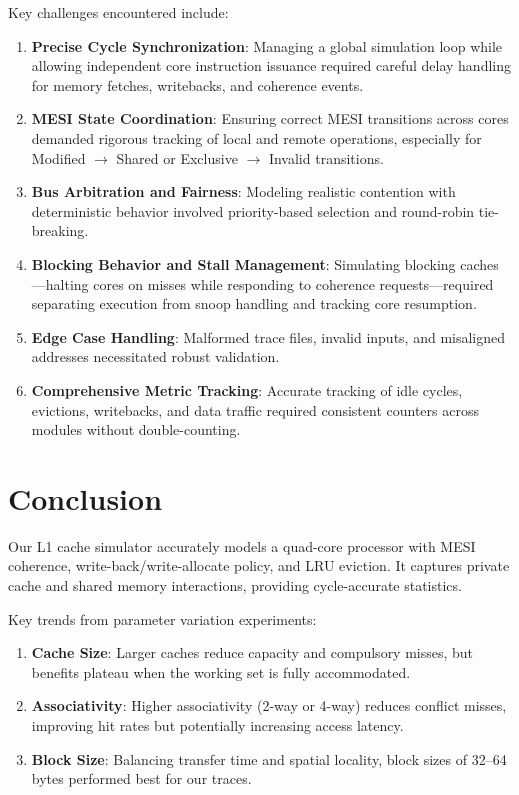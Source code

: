 \documentclass[11pt]{article}
\begin{document}
Key challenges encountered include:
\begin{enumerate}
    \item \textbf{Precise Cycle Synchronization}: Managing a global simulation loop while allowing independent core instruction issuance required careful delay handling for memory fetches, writebacks, and coherence events.
    \item \textbf{MESI State Coordination}: Ensuring correct MESI transitions across cores demanded rigorous tracking of local and remote operations, especially for Modified $\to$ Shared or Exclusive $\to$ Invalid transitions.
    \item \textbf{Bus Arbitration and Fairness}: Modeling realistic contention with deterministic behavior involved priority-based selection and round-robin tie-breaking.
    \item \textbf{Blocking Behavior and Stall Management}: Simulating blocking caches—halting cores on misses while responding to coherence requests—required separating execution from snoop handling and tracking core resumption.
    \item \textbf{Edge Case Handling}: Malformed trace files, invalid inputs, and misaligned addresses necessitated robust validation.
    \item \textbf{Comprehensive Metric Tracking}: Accurate tracking of idle cycles, evictions, writebacks, and data traffic required consistent counters across modules without double-counting.
\end{enumerate}

\section{Conclusion}\nopagebreak

Our L1 cache simulator accurately models a quad-core processor with MESI coherence, write-back/write-allocate policy, and LRU eviction. It captures private cache and shared memory interactions, providing cycle-accurate statistics.

Key trends from parameter variation experiments:
\begin{enumerate}
    \item \textbf{Cache Size}: Larger caches reduce capacity and compulsory misses, but benefits plateau when the working set is fully accommodated.
    \item \textbf{Associativity}: Higher associativity (2-way or 4-way) reduces conflict misses, improving hit rates but potentially increasing access latency.
    \item \textbf{Block Size}: Balancing transfer time and spatial locality, block sizes of 32–64 bytes performed best for our traces.
\end{enumerate}
\end{document}
